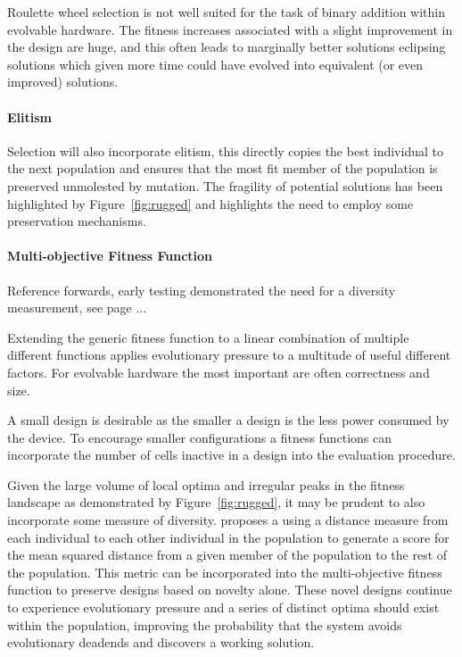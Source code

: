 Roulette wheel selection is not well suited for the task of binary addition
within evolvable hardware. The fitness increases associated with a slight
improvement in the design are huge, and this often leads to marginally better
solutions eclipsing solutions which given more time could have evolved into
equivalent (or even improved) solutions.

\paragraph{Elitism}

Selection will also incorporate elitism, this directly copies the best individual
to the next population and ensures that the most fit member
of the population is preserved unmolested by mutation. The fragility of potential
solutions has been highlighted by Figure~\ref{fig:rugged} and highlights the
need to employ some preservation mechanisms.

\paragraph{Multi-objective Fitness Function}
\todo Reference forwards, early testing demonstrated the need for a diversity
measurement, see page ...

Extending the generic fitness function to a linear combination of multiple different
functions applies evolutionary pressure to a multitude of useful different factors.
For evolvable hardware the most important are often correctness and size.

A small design is desirable as the smaller a design is the less power consumed
by the device. To encourage smaller configurations a fitness functions can
incorporate the number of cells inactive in a design into the evaluation
procedure.

Given the large volume of local optima and irregular peaks in the fitness
landscape as demonstrated by Figure~\ref{fig:rugged}, it may be prudent to
also incorporate some measure of diversity. \cite{deJong:2001:RBP:2955239.2955241}
proposes a using a
distance measure from each individual to each other individual in the population
to generate a score for the mean squared distance from a given member of the
population to the rest of the population. This metric can be incorporated into
the multi-objective fitness function to preserve designs based on novelty alone.
These novel designs continue to experience evolutionary pressure and a series
of distinct optima should exist within the population, improving the probability
that the system avoids evolutionary deadends and discovers a working solution.

